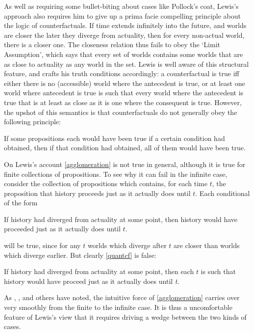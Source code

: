 \documentclass[If.tex]{subfiles}
\begin{document}
As well as requiring some bullet-biting about cases like Pollock's coat, Lewis's approach also requires him to give up a prima facie compelling principle about the logic of counterfactuals. If time extends infinitely into the future, and worlds are closer the later they diverge from actuality, then for every non-actual world, there is a closer one. The closeness relation thus fails to obey the ‘Limit Assumption’, which says that every set of worlds contains some worlds that are as close to actuality as any world in the set. Lewis is well aware of this structural feature, and crafts his truth conditions accordingly: a counterfactual is true iff either there is no (accessible) world where the antecedent is true, or at least one world where antecedent is true is such that every world where the antecedent is true that is at least as close as it is one where the consequent is true. However, the upshot of this semantics is that counterfactuals do not generally obey the following principle:
\begin{prop}  
	\litem[Agglomeration] \label{agglomeration}
	If some propositions each would have been true if a certain condition had obtained, then if that condition had obtained, all of them would have been true.
\end{prop}
On Lewis's account \ref{agglomeration} is not true in general, although it is true for finite collections of propositions. To see why it can fail in the infinite case, consider the collection of propositions which contains, for each time $t$, the proposition that history proceeds just as it actually does until $t$. Each conditional of the form
\begin{prop}
	\nitem \label{cfquant}
		If history had diverged from actuality at some point, then history would have proceeded just as it actually does until $t$.
\end{prop}
will be true, since for any $t$ worlds which diverge after $t$ are closer than worlds which diverge earlier. But clearly \ref{quantcf} is false:
\begin{prop}
	\nitem \label{quantcf}
		If history had diverged from actuality at some point, then each $t$ is such that history would have proceed just as it actually does until \emph{t.}
\end{prop}
As \citet{PollockPWAC,PollockSR}, \citet{FineCWPW}, and others have noted, the intuitive force of \ref{agglomeration} carries over very smoothly from the finite to the infinite case. It is thus a uncomfortable feature of Lewis's view that it requires driving a wedge between the two kinds of cases.
\end{document}
